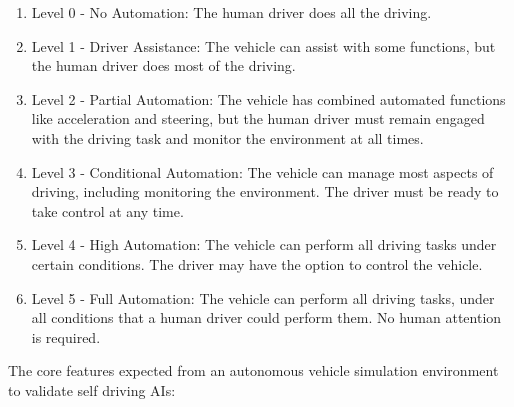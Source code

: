 \begin{enumerate}
    \item Level 0 - No Automation: The human driver does all the driving.
    \item Level 1 - Driver Assistance: The vehicle can assist with some functions, but the human driver does most of the driving.
    \item Level 2 - Partial Automation: The vehicle has combined automated functions like acceleration and steering, but the human driver must remain engaged with the driving task and monitor the environment at all times.
    \item Level 3 - Conditional Automation: The vehicle can manage most aspects of driving, including monitoring the environment. The driver must be ready to take control at any time.
    \item Level 4 - High Automation: The vehicle can perform all driving tasks under certain conditions. The driver may have the option to control the vehicle.
    \item Level 5 - Full Automation: The vehicle can perform all driving tasks, under all conditions that a human driver could perform them. No human attention is required.
\end{enumerate}

The core features expected from an autonomous vehicle simulation environment to validate self driving AIs:

